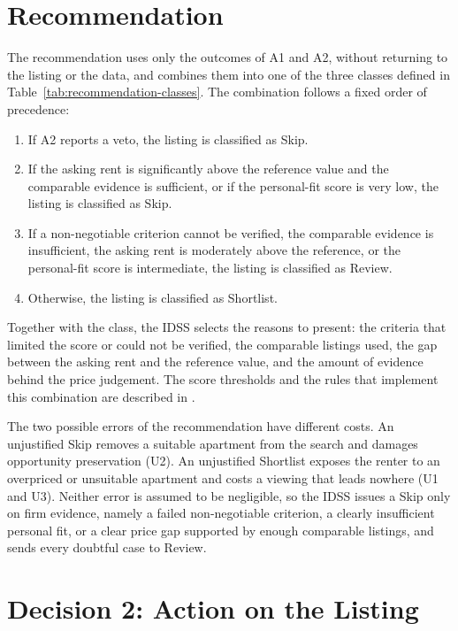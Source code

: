 \documentclass[12pt,a4paper]{report}
\begin{document}
\section{Recommendation}

The recommendation uses only the outcomes of A1 and A2, without returning
to the listing or the data, and combines them into one of the three classes defined in Table~\ref{tab:recommendation-classes}. The
combination follows a fixed order of precedence:

\begin{enumerate}[leftmargin=*]
  \item If A2 reports a veto, the listing is classified as Skip.
  \item If the asking rent is significantly above the reference value and
  the comparable evidence is sufficient, or if the personal-fit score is
  very low, the listing is classified as Skip.
  \item If a non-negotiable criterion cannot be verified, the comparable
  evidence is insufficient, the asking rent is moderately above the
  reference, or the personal-fit score is intermediate, the listing is
  classified as Review.
  \item Otherwise, the listing is classified as Shortlist.
\end{enumerate}

Together with the class, the IDSS selects the reasons to present: the
criteria that limited the score or could not be verified, the comparable
listings used, the gap between the asking rent and the reference value, and
the amount of evidence behind the price judgement. The score thresholds and
the rules that implement this combination are described in
.

The two possible errors of the recommendation have different costs. An
unjustified Skip removes a suitable apartment from the search and damages
opportunity preservation (U2). An unjustified Shortlist exposes the renter
to an overpriced or unsuitable apartment and costs a viewing that leads
nowhere (U1 and U3). Neither error is assumed to be negligible, so the IDSS
issues a Skip only on firm evidence, namely a failed non-negotiable
criterion, a clearly insufficient personal fit, or a clear price gap
supported by enough comparable listings, and sends every doubtful case to
Review.

\section{Decision 2: Action on the Listing}
\end{document}
